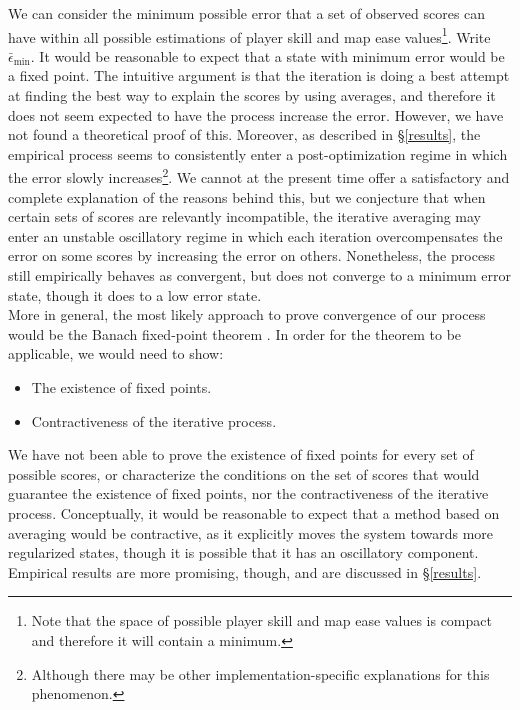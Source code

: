 \documentclass[12pt,a4paper]{article}
\begin{document}
We can consider the minimum possible error that a set of observed scores can have within all possible estimations of player skill and map ease values\footnote{Note that the space of possible player skill and map ease values is compact and therefore it will contain a minimum.}. Write ${\bar{\epsilon}}_{\min}$. It would be reasonable to expect that a state with minimum error would be a fixed point. The intuitive argument is that the iteration is doing a best attempt at finding the best way to explain the scores by using averages, and therefore it does not seem expected to have the process increase the error. However, we have not found a theoretical proof of this. Moreover, as described in \S \ref{results}, the empirical process seems to consistently enter a post-optimization regime in which the error slowly increases\footnote{Although there may be other implementation-specific explanations for this phenomenon.}. We cannot at the present  time offer a satisfactory and complete explanation of the reasons behind this, but we conjecture that when certain sets of scores are relevantly incompatible, the iterative averaging may enter an unstable oscillatory regime in which each iteration overcompensates the error on some scores by increasing the error on others. Nonetheless, the process still empirically behaves as convergent, but does not converge to a minimum error state, though it does to a low error state.\\

More in general, the most likely approach to prove convergence of our process would be the Banach fixed-point theorem \cite{wiki_banach_fixed_point}. In order for the theorem to be applicable, we would need to show:
\begin{itemize}
\item The existence of fixed points.
\item Contractiveness of the iterative process.
\end{itemize}

We have not been able to prove the existence of fixed points for every set of possible scores, or characterize the conditions on the set of scores that would guarantee the existence of fixed points, nor the contractiveness of the iterative process. Conceptually, it would be reasonable to expect that a method based on averaging would be contractive, as it explicitly moves the system towards more regularized states, though it is possible that it has an oscillatory component. Empirical results are more promising, though, and are discussed in \S \ref{results}.\\
\end{document}
